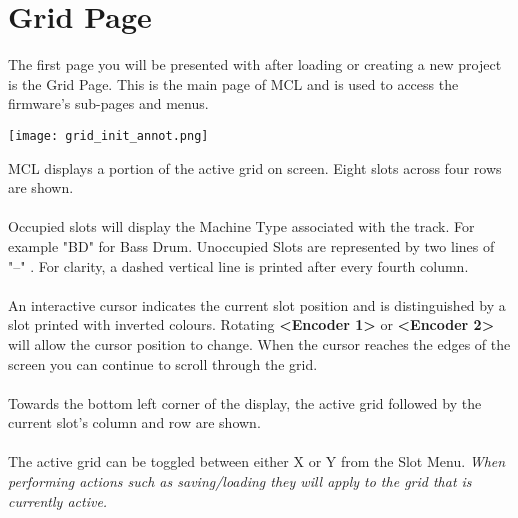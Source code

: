 
\chapter{Grid Page}
The first page you will be presented with after loading or creating a new project is the Grid Page. This is the main page of MCL and is used to access the firmware's sub-pages and menus.

\begin{center}
	\texttt{[image: grid\_init\_annot.png]}
\end{center}
MCL displays a portion of the active grid on screen. 
Eight slots across four rows are shown.\\
\\
Occupied slots will display the Machine Type associated with the track. For example "BD" for Bass Drum. Unoccupied Slots are represented by two lines of "--" . For clarity, a dashed vertical line is printed after every fourth column.\\\\
An interactive cursor indicates the current slot position and is distinguished by a slot printed with inverted colours. Rotating \textbf{<Encoder 1>} or \textbf{<Encoder 2>} will allow the cursor position to change. When the cursor reaches the edges of the screen you can continue to scroll through the grid.
\\\\
Towards the bottom left corner of the display, the active grid followed by the current slot's column and row are shown.\\\\
The active grid can be toggled between either X or Y from the Slot Menu.
\textit{When performing actions such as saving/loading they will apply to the grid that is currently active.}
